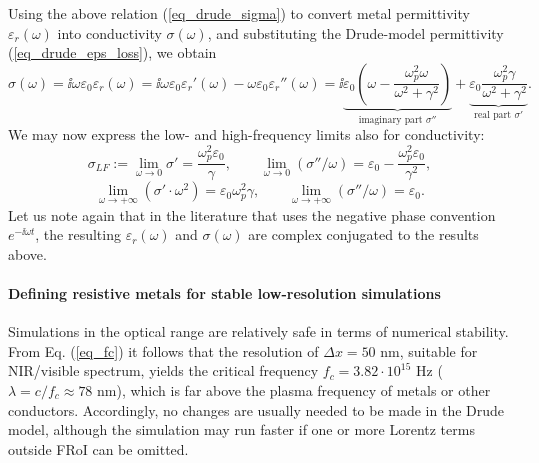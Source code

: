 Using the above relation (\ref{eq_drude_sigma}) to convert metal permittivity $\varepsilon_r(\omega)$ into conductivity $\sigma(\omega)$, and substituting the Drude-model permittivity (\ref{eq_drude_eps_loss}), we obtain
\begin{equation} \sigma(\omega) = \ii \omega \varepsilon_0 \varepsilon_r(\omega)= \ii\omega \varepsilon_0 \varepsilon_r'(\omega)  -  \omega \varepsilon_0 \varepsilon_r''(\omega) = 
	\ii \underbrace{\varepsilon_0 \left(\omega - \frac{\omega_p^2\omega}{\omega^2+\gamma^2}\right)}_{\text{imaginary part } \sigma''}  + 
		\underbrace{\varepsilon_0\frac{\omega_p^2\gamma}{\omega^2+\gamma^2}}_{\text{real part } \sigma'}. \label{eq_drude_sigmaeps1}\end{equation}
We may now express the low- and high-frequency limits also for conductivity:
\begin{equation} \sigma_{LF} := \lim_{\omega \to 0} \sigma' = \frac{\omega_p^2\varepsilon_0}{\gamma}, \quad \quad  
				 \lim_{\omega \to 0} (\sigma'' / \omega) = \varepsilon_0 - \frac{\omega_p^2 \varepsilon_0}{\gamma^2} , \label{eq_drude_sigmalimlow}\end{equation}
\begin{equation} \lim_{\omega \to +\infty} (\sigma' \cdot \omega^2) = \varepsilon_0\omega_p^2\gamma, \quad \quad  
				 \lim_{\omega \to +\infty} (\sigma'' / \omega) = \varepsilon_0. \label{eq_drude_sigma_limup}\end{equation}
Let us note again that in the literature that uses the negative phase convention $e^{-\ii \omega t}$, the resulting $\varepsilon_r(\omega)$ and $\sigma(\omega)$ are complex conjugated to the results above. 

\paragraph{Defining resistive metals for stable low-resolution simulations} %
Simulations in the optical range are relatively safe in terms of numerical stability. From Eq. (\ref{eq_fc}) it follows that the resolution of $\Delta x = 50$ nm, suitable for NIR/visible spectrum, yields the critical frequency $f_c = 3.82\cdot 10^{15}$ Hz ($\lambda = c/f_c \approx 78$ nm), which is far above the plasma frequency of metals or other conductors. Accordingly, no changes are usually needed to be made in the Drude model, although the simulation may run faster if one or more Lorentz terms outside FRoI can be omitted.
 
